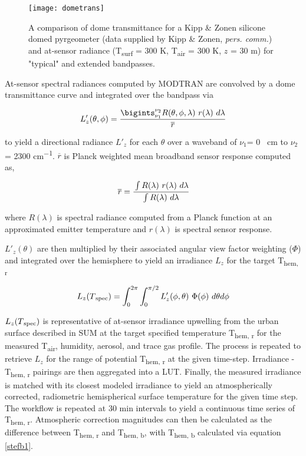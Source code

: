 \begin{bibunit}
\begin{figure}[H]
	\texttt{[image: dometrans]}
	\caption{A comparison of dome transmittance for a Kipp \& Zonen silicone domed pyrgeometer (data supplied by Kipp \& Zonen, \textit{pers. comm.}) and at-sensor radiance (T\textsubscript{surf} = 300 \si{K}, T\textsubscript{air} = 300 \si{K}, $z$ = 30 \si{m})  for "typical" and extended bandpasses.}
	\label{dometrans}
\end{figure}

At-sensor spectral radiances computed by MODTRAN are convolved by a dome transmittance curve and integrated over the bandpass via 

\begin{equation}
\label{work1}
	L'_z (\theta, \phi) = \frac{\bigints_{\nu_1}^{\nu_2} R(\theta, \phi, \lambda) ~ r(\lambda) ~ d\lambda}{\overline{r}}
\end{equation}

\noindent to yield a directional radiance $ L'_z $ for each $\theta$ over a waveband of $\nu_1 $= 0 \si{\per\centi\meter} to $\nu_2$ = 2300 \si{cm^{-1}}. $ \overline{r} $ is Planck weighted mean broadband sensor response computed as,

\begin{equation}
\label{meansens}
\overline{r} = \cfrac{\int R(\lambda) ~ r(\lambda)~d\lambda}{\int R(\lambda) ~ d\lambda}
\end{equation}

\noindent where $ R(\lambda) $ is spectral radiance computed from a Planck function at an approximated emitter temperature and $r (\lambda)$ is spectral sensor response. 

$ L'_z (\theta) $ are then multiplied by their associated angular view factor weighting ($\Phi$) and integrated over the hemisphere to yield an irradiance $ L_z $ for the target T\textsubscript{hem, r}

\begin{equation}
\label{work2}
	L_z (T\textsubscript{spec}) = \int_{0}^{2\pi}\int_{0}^{\pi/2} L'_z (\phi, \theta) ~ \Phi (\phi) ~ d\theta d\phi
\end{equation}

$L_z (T\textsubscript{spec}) $ is representative of at-sensor irradiance upwelling from the urban surface described in SUM at the target specified temperature T\textsubscript{hem, r} for the measured T\textsubscript{air}, humidity, aerosol, and trace gas profile. The process is repeated to retrieve $L_z$ for the range of potential T\textsubscript{hem, r} at the given time-step. Irradiance - T\textsubscript{hem, r} pairings are then aggregated into a LUT. Finally, the measured irradiance is matched with its closest modeled irradiance to yield an atmospherically corrected, radiometric hemispherical surface temperature for the given time step. The workflow is repeated at 30 \si{\minute} intervals to yield a continuous time series of T\textsubscript{hem, r}. Atmospheric correction magnitudes can then be calculated as the difference between T\textsubscript{hem, r} and T\textsubscript{hem, b}, with T\textsubscript{hem, b} calculated via equation \ref{stefb1}.


\end{bibunit}
